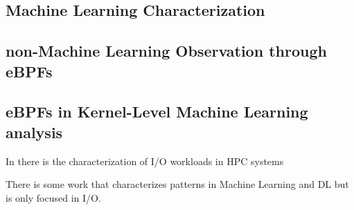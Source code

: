\documentclass[conference]{IEEEtran}
\begin{document}
\subsection{Machine Learning Characterization}

\subsection{non-Machine Learning Observation through eBPFs}

\subsection{eBPFs in Kernel-Level Machine Learning analysis}

In there is the characterization of I/O workloads in HPC systems

There is some work that characterizes patterns in Machine Learning \cite{OanaML} and DL \cite{OanaDL} but is only focused in I/O.
\end{document}
